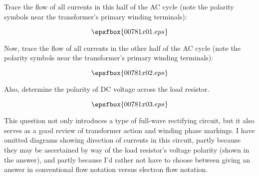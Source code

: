 

Trace the flow of all currents in this half of the AC cycle (note the polarity symbols near the transformer's primary winding terminals):

$$\epsfbox{00781x01.eps}$$

Now, trace the flow of all currents in the other half of the AC cycle (note the polarity symbols near the transformer's primary winding terminals):

$$\epsfbox{00781x02.eps}$$

Also, determine the polarity of DC voltage across the load resistor.







$$\epsfbox{00781x03.eps}$$







This question not only introduces a type of full-wave rectifying circuit, but it also serves as a good review of transformer action and winding phase markings.  I have omitted diagrams showing direction of currents in this circuit, partly because they may be ascertained by way of the load resistor's voltage polarity (shown in the answer), and partly because I'd rather not have to choose between giving an answer in conventional flow notation versus electron flow notation.




